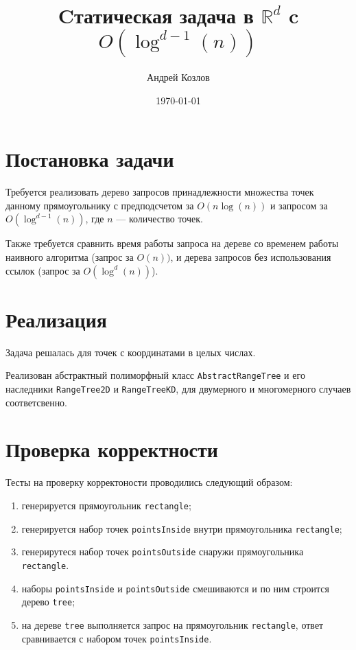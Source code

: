\documentclass[12pt,a4paper]{article}
\begin{document}
\title{Cтатическая задача в $\mathbb{R}^d$ c $O(\log^{d - 1}(n))$}
\author{Андрей Козлов}
\date{\today}

\maketitle

\section*{Постановка задачи}

Требуется реализовать дерево запросов принадлежности множества точек данному прямоугольнику с предподсчетом за $O(n \log(n))$ и запросом за $O(\log^{d - 1}(n))$, где $n$ --- количество точек.

Также требуется сравнить время работы запроса на дереве со временем работы наивного алгоритма (запрос за $O(n))$, и дерева запросов без использования ссылок (запрос за $O(\log^d(n))$).

\section*{Реализация}

Задача решалась для точек с координатами в целых числах.

Реализован абстрактный полиморфный класс \texttt{AbstractRangeTree} и его наследники \texttt{RangeTree2D} и \texttt{RangeTreeKD}, для двумерного и многомерного случаев соответсвенно.

\section*{Проверка корректности}

Тесты на проверку корректоности проводились следующий образом:
\begin{enumerate}
	\item генерируется прямоугольник \texttt{rectangle};
	\item генерируется набор точек \texttt{pointsInside} внутри прямоугольника \texttt{rectangle};
	\item генерирутеся набор точек \texttt{pointsOutside} снаружи прямоугольника \texttt{rectangle}.
	\item наборы \texttt{pointsInside} и \texttt{pointsOutside} смешиваются и по ним строится дерево \texttt{tree};
	\item на дереве \texttt{tree} выполняется запрос на прямоугольник \texttt{rectangle}, ответ сравнивается с набором точек \texttt{pointsInside}.
\end{enumerate}
\end{document}
